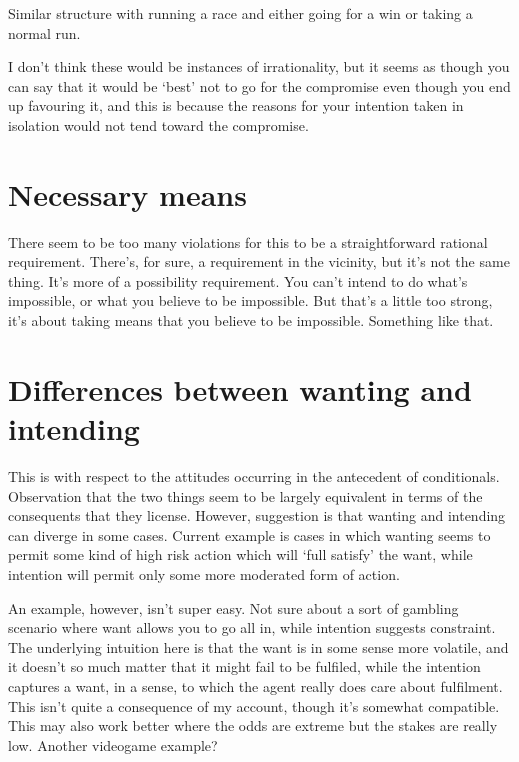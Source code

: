 \documentclass[10pt]{article}
\begin{document}
Similar structure with running a race and either going for a win or taking a normal run.

I don't think these would be instances of irrationality, but it seems as though you can say that it would be `best' not to go for the compromise even though you end up favouring it, and this is because the reasons for your intention taken in isolation would not tend toward the compromise.

\newpage

\section{Necessary means}
\label{sec:necessary-means}

There seem to be too many violations for this to be a straightforward rational requirement.
There's, for sure, a requirement in the vicinity, but it's not the same thing.
It's more of a possibility requirement.
You can't intend to do what's impossible, or what you believe to be impossible.
But that's a little too strong, it's about taking means that you believe to be impossible.
Something like that.


\section{Differences between wanting and intending}
\label{sec:diff-betw-want}

This is with respect to the attitudes occurring in the antecedent of conditionals.
Observation that the two things seem to be largely equivalent in terms of the consequents that they license.
However, suggestion is that wanting and intending can diverge in some cases.
Current example is cases in which wanting seems to permit some kind of high risk action which will `full satisfy' the want, while intention will permit only some more moderated form of action.

An example, however, isn't super easy.
Not sure about a sort of gambling scenario where want allows you to go all in, while intention suggests constraint.
The underlying intuition here is that the want is in some sense more volatile, and it doesn't so much matter that it might fail to be fulfiled, while the intention captures a want, in a sense, to which the agent really does care about fulfilment.
This isn't quite a consequence of my account, though it's somewhat compatible.
This may also work better where the odds are extreme but the stakes are really low.
Another videogame example?
\end{document}
